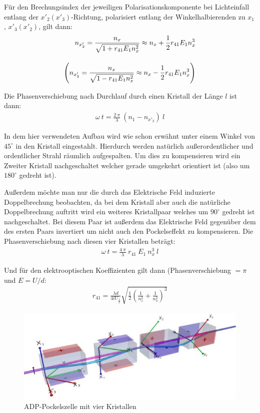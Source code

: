 \documentclass[12pt]{article}
\begin{document}
Für den Brechungsindex der jeweiligen Polarisationskomponente bei Lichteinfall entlang der $x'_2 (x'_3)$-Richtung, polarisiert entlang der Winkelhalbierenden zu $x_1$, $x'_3 (x'_2)$, gilt dann:
\begin{align}
 n_{x'_2} = \frac{n_x}{\sqrt{1 + r_{41} E_1 n_x^2}} \approx n_x + \frac{1}{2} r_{41} E_1 n_x^3 \\[10pt]
\notag \left( n_{x'_3} = \frac{n_x}{\sqrt{1 - r_{41} E_1 n_x^2}} \approx n_x - \frac{1}{2} r_{41} E_1 n_x^3 \right)
\end{align}

Die Phasenverschiebung nach Durchlauf durch einen Kristall der Länge $l$ ist dann:
\begin{align}
 \omega~t = \frac{2~\pi}{\lambda}~(n_1 - n_{x'_2})~l
\end{align}

In dem hier verwendeten Aufbau wird wie schon erwähnt unter einem Winkel von $45^\circ$ in den Kristall eingestahlt. Hierdurch werden natürlich außerordentlicher und ordentlicher Strahl räumlich aufgespalten. Um dies zu kompensieren wird ein Zweiter Kristall nachgeschaltet welcher gerade umgekehrt orientiert ist (also um $180^\circ$ gedreht ist).

Außerdem möchte man nur die durch das Elektrische Feld induzierte Doppelbrechung beobachten, da bei dem Kristall aber auch die natürliche Doppelbrechung auftritt wird ein weiteres Kristallpaar welches um $90^\circ$ gedreht ist nachgeschaltet. Bei diesem Paar ist außerdem das Elektrische Feld gegenüber dem des ersten Paars invertiert um nicht auch den Pockelseffekt zu kompensieren. Die Phasenverschiebung nach diesen vier Kristallen beträgt:
\begin{align}
 \omega~t = \frac{4~\pi}{\lambda}~r_{41}~E_1~n_x^3~l
\end{align}

Und für den elektrooptischen Koeffizienten gilt dann (Phasenverschiebung $= \pi$ und $E = U/d$:
\begin{align}
 r_{41} = \frac{\lambda d}{4 l U_{\frac{\lambda}{2}}} \sqrt{\frac{1}{2} \left( \frac{1}{n_1^2} + \frac{1}{n_3^2}\right)^3}
\end{align}

\begin{figure}[H]
\centering
\includegraphics[width=1\linewidth]{pictures/adp-zelle.eps}
\caption{ADP-Pockelszelle mit vier Kristallen}
\end{figure}
\end{document}
